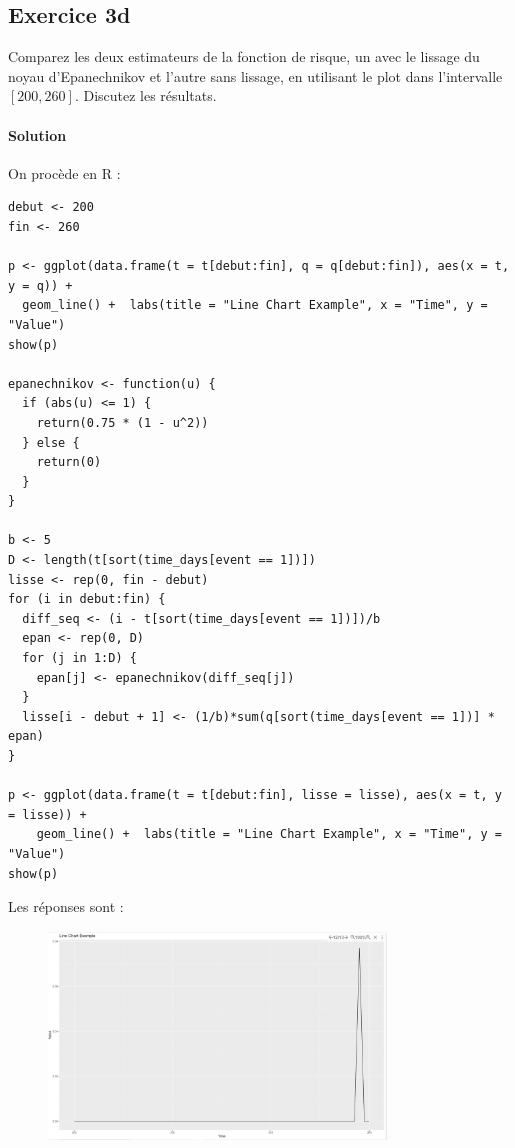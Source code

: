 \documentclass[../main.tex]{subfiles}
\begin{document}
\begin{CJK*}{UTF8}{gbsn}

\section*{Exercice 3d}

Comparez les deux estimateurs de la fonction de risque,
un avec le lissage du noyau d'Epanechnikov et l'autre sans lissage,
en utilisant le plot dans l'intervalle $[200,260]$.
Discutez les résultats.

\paragraph{Solution}

On procède en R :

\begin{lstlisting}
debut <- 200
fin <- 260

p <- ggplot(data.frame(t = t[debut:fin], q = q[debut:fin]), aes(x = t, y = q)) +
  geom_line() +  labs(title = "Line Chart Example", x = "Time", y = "Value")
show(p)

epanechnikov <- function(u) {
  if (abs(u) <= 1) {
    return(0.75 * (1 - u^2))
  } else {
    return(0)
  }
}

b <- 5
D <- length(t[sort(time_days[event == 1])])
lisse <- rep(0, fin - debut)
for (i in debut:fin) {
  diff_seq <- (i - t[sort(time_days[event == 1])])/b
  epan <- rep(0, D)
  for (j in 1:D) {
    epan[j] <- epanechnikov(diff_seq[j])
  }
  lisse[i - debut + 1] <- (1/b)*sum(q[sort(time_days[event == 1])] * epan)
}

p <- ggplot(data.frame(t = t[debut:fin], lisse = lisse), aes(x = t, y = lisse)) +
    geom_line() +  labs(title = "Line Chart Example", x = "Time", y = "Value")
show(p)
\end{lstlisting}

Les réponses sont :

\begin{figure}[H]
  \centering
  \includegraphics[width=0.8\textwidth]{3D2.JPG}
  \label{fig:mesh1}
\end{figure}


\end{CJK*}
\end{document}
